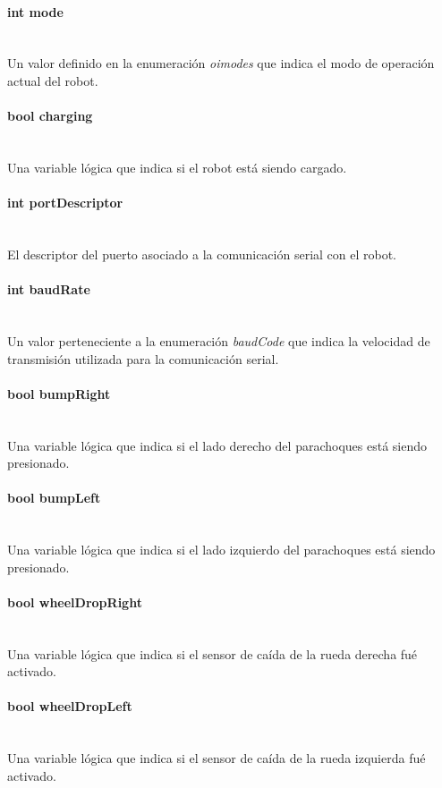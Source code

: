 \documentclass[letterpaper,openright,12pt]{book}
\begin{document}
\paragraph{int mode}\mbox{}\\
Un valor definido en la enumeración \emph{oimodes} que indica el modo de operación actual del robot.
\paragraph{bool charging}\mbox{}\\
Una variable lógica que indica si el robot está siendo cargado.
\paragraph{int portDescriptor}\mbox{}\\
El descriptor del puerto asociado a la comunicación serial con el robot.
\paragraph{int baudRate}\mbox{}\\
Un valor perteneciente a la enumeración \emph{baudCode} que indica la velocidad de transmisión utilizada para la comunicación serial.
\paragraph{bool bumpRight}\mbox{}\\
Una variable lógica que indica si el lado derecho del parachoques está siendo presionado.
\paragraph{bool bumpLeft}\mbox{}\\
Una variable lógica que indica si el lado izquierdo del parachoques está siendo presionado.
\paragraph{bool wheelDropRight}\mbox{}\\
Una variable lógica que indica si el sensor de caída de la rueda derecha fué activado.
\paragraph{bool wheelDropLeft}\mbox{}\\
Una variable lógica que indica si el sensor de caída de la rueda izquierda fué activado.
\end{document}

